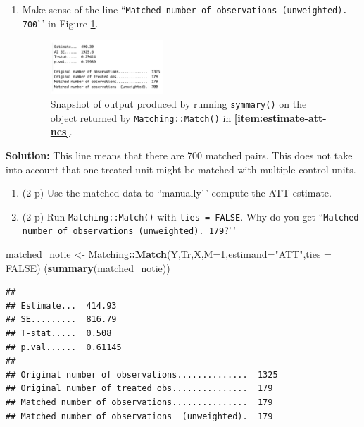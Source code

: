 \documentclass[
]{article}
\newenvironment{Shaded}{\begin{snugshade}}{\end{snugshade}}
\newcommand{\AttributeTok}[1]{\textcolor[rgb]{0.13,0.29,0.53}{#1}}
\newcommand{\ConstantTok}[1]{\textcolor[rgb]{0.56,0.35,0.01}{#1}}
\newcommand{\DecValTok}[1]{\textcolor[rgb]{0.00,0.00,0.81}{#1}}
\newcommand{\FunctionTok}[1]{\textcolor[rgb]{0.13,0.29,0.53}{\textbf{#1}}}
\newcommand{\NormalTok}[1]{#1}
\newcommand{\OtherTok}[1]{\textcolor[rgb]{0.56,0.35,0.01}{#1}}
\newcommand{\SpecialCharTok}[1]{\textcolor[rgb]{0.81,0.36,0.00}{\textbf{#1}}}
\newcommand{\StringTok}[1]{\textcolor[rgb]{0.31,0.60,0.02}{#1}}
\providecommand{\tightlist}{%
  \setlength{\itemsep}{0pt}\setlength{\parskip}{0pt}}
\begin{document}
\begin{enumerate}
\def\labelenumi{\alph{enumi}.}
\setcounter{enumi}{5}
\tightlist
\item
  Make sense of the line
  ``\texttt{Matched number of observations (unweighted). 700}'\,' in
  Figure \ref{fig:nnm_output}.

  \begin{figure}[h]
       \centering
       \captionsetup{width=.6\textwidth}
       \includegraphics[width=0.4\textwidth]{figures/q7_f.png}
       \caption{Snapshot of output produced by running \texttt{symmary()} on the object returned by \texttt{Matching::Match()} in \textbf{\ref{item:estimate-att-ncs}}.}
       \label{fig:nnm_output}
       \end{figure}
\end{enumerate}

\textbf{Solution:} This line means that there are 700 matched pairs.
This does not take into account that one treated unit might be matched
with multiple control units.

\begin{enumerate}
\def\labelenumi{\alph{enumi}.}
\setcounter{enumi}{6}
\tightlist
\item
  (2 p) Use the matched data to ``manually'\,' compute the ATT estimate.
\item
  (2 p) Run \texttt{Matching::Match()} with \texttt{ties = FALSE}. Why
  do you get
  ``\texttt{Matched number of observations (unweighted). 179}?'\,'
\end{enumerate}

\begin{Shaded}
\begin{Highlighting}[]
\NormalTok{matched\_notie }\OtherTok{\textless{}{-}}\NormalTok{ Matching}\SpecialCharTok{::}\FunctionTok{Match}\NormalTok{(Y,Tr,X,}\AttributeTok{M=}\DecValTok{1}\NormalTok{,}\AttributeTok{estimand=}\StringTok{"ATT"}\NormalTok{,}\AttributeTok{ties =} \ConstantTok{FALSE}\NormalTok{)}
\NormalTok{(}\FunctionTok{summary}\NormalTok{(matched\_notie))}
\end{Highlighting}
\end{Shaded}

\begin{verbatim}
## 
## Estimate...  414.93 
## SE.........  816.79 
## T-stat.....  0.508 
## p.val......  0.61145 
## 
## Original number of observations..............  1325 
## Original number of treated obs...............  179 
## Matched number of observations...............  179 
## Matched number of observations  (unweighted).  179
\end{verbatim}
\end{document}

